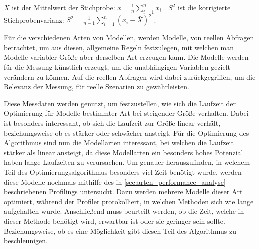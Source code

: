 \begin{equation*}
    [\bar{X} - t_{n-1,1-\alpha/2}\sqrt{S^2/n}, \bar{X} + t_{n-1,1-\alpha/2}\sqrt{S^2/n}]
\end{equation*}

$\bar{X}$ ist der Mittelwert der Stichprobe: $\bar{x} = \frac{1}{n}
\displaystyle\sum^{n}_{i=1}x_i$ \autocite[vgl.][S.59]{Statistik}.
$S^2$ ist die korrigierte Stichprobenvarianz: $S^2 =
\frac{1}{n-1}\displaystyle\sum^{n}_{i=1}(x_i-\bar{X})^2$ \autocite[vgl.][S.507]{Statistik}.

Für die verschiedenen Arten von Modellen, werden Modelle, von reellen Abfragen
betrachtet, um aus diesen, allgemeine Regeln festzulegen, mit welchen man
Modelle variabler Größe aber derselben Art erzeugen kann. Die Modelle werden
für die Messung künstlich erzeugt, um die unabhängigen Variablen gezielt
verändern zu können. Auf die reellen Abfragen wird dabei zurückgegriffen, um
die Relevanz der Messung, für reelle Szenarien zu gewährleisten.
\autocite[Vgl.][S.500f]{ExperimentalAnalysis}

Diese Messdaten werden genutzt, um festzustellen, wie sich die Laufzeit der
Optimierung für Modelle bestimmter Art bei steigender Größe verhalten. Dabei
ist besonders interessant, ob sich die Laufzeit zur Größe linear verhält,
beziehungsweise ob es stärker oder schwächer ansteigt. Für die Optimierung des
Algorithmus sind nun die Modellarten interessant, bei welchen die Laufzeit
stärker als linear ansteigt, da diese Modellarten ein besonders hohes Potenzial
haben lange Laufzeiten zu verursachen. Um genauer herauszufinden, in welchem
Teil des Optimierungsalgorithmus besonders viel Zeit benötigt wurde, werden
diese Modelle nochmals mithilfe des in \autoref{sec:arten_performance_analyse}
beschriebenen Profilings untersucht. Dazu werden mehrere Modelle dieser Art
optimiert, während der Profiler protokolliert, in welchen Methoden sich wie
lange aufgehalten wurde. Anschließend muss beurteilt werden, ob die Zeit,
welche in dieser Methode benötigt wird, erwartbar ist oder sie geringer sein
sollte. Beziehungsweise, ob es eine Möglichkeit gibt diesen Teil des
Algorithmus zu beschleunigen.


